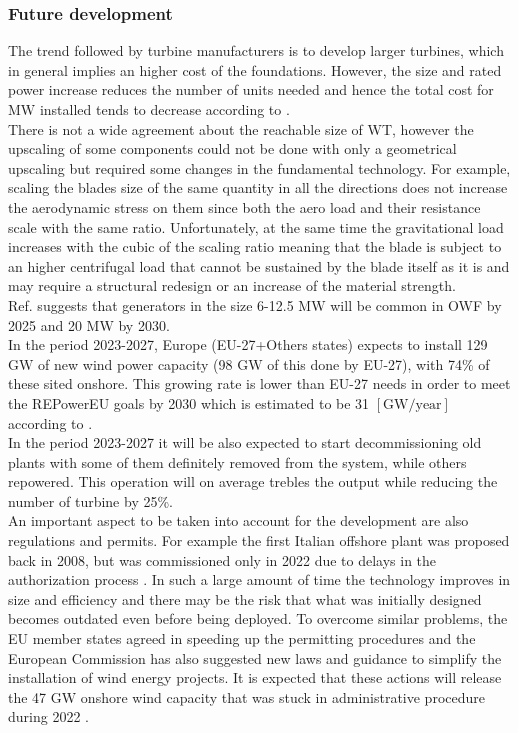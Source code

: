 \subsubsection{Future development}
The trend followed by turbine manufacturers is to develop larger turbines, which in general implies an higher cost of the foundations. However, the size and rated power increase reduces the number of units needed and hence the total cost for $\si{\mega\watt}$ installed tends to decrease according to \cite{current_staus_and_future_trends_of_offshore_wind_power_in_europe}.\\
There is not a wide agreement about the reachable size of WT, however the upscaling of some components could not be done with only a geometrical upscaling but required some changes in the fundamental technology. For example, scaling the blades size of the same quantity in all the directions does not increase the aerodynamic stress on them since both the aero load and their resistance scale with the same ratio. Unfortunately, at the same time the gravitational load increases with the cubic of the scaling ratio meaning that the blade is subject to an higher centrifugal load that cannot be sustained by the blade itself as it is and may require a structural redesign or an increase of the material strength. \\
Ref. \cite{current_staus_and_future_trends_of_offshore_wind_power_in_europe} suggests that generators in the size 6-12.5 $\si{\mega\watt}$ will be common in OWF by 2025 and 20 $\si{\mega\watt}$ by 2030.\\
In the period 2023-2027, Europe (EU-27+Others states) expects to install 129 $\si{\giga\watt}$ of new wind power capacity (98 $\si{\giga\watt}$ of this done by EU-27), with 74\% of these sited onshore. This growing rate is lower than EU-27 needs in order to meet the REPowerEU goals by 2030 which is estimated to be 31 $\left[\text{GW/year}\right]$ according to \cite{wind_europe_data_2022}. \\
In the period 2023-2027 it will be also expected to start decommissioning old plants with some of them definitely removed from the system, while others repowered. This operation will on average trebles the output while reducing the number of turbine by 25\%. \\
An important aspect to be taken into account for the development are also regulations and permits. For example the first Italian offshore plant was proposed back in 2008, but was commissioned only in 2022 due to delays in the authorization process \cite{il_post}. In such a large amount of time the technology improves in size and efficiency and there may be the risk that what was initially designed becomes outdated even before being deployed. To overcome similar problems, the EU member states agreed in speeding up the permitting procedures and the European Commission has also suggested new laws and guidance to simplify the installation of wind energy projects. It is expected that these actions will release the 47 $\si{\giga\watt}$ onshore wind capacity that was stuck in administrative procedure during 2022 \cite{wind_europe_data_2022}.  